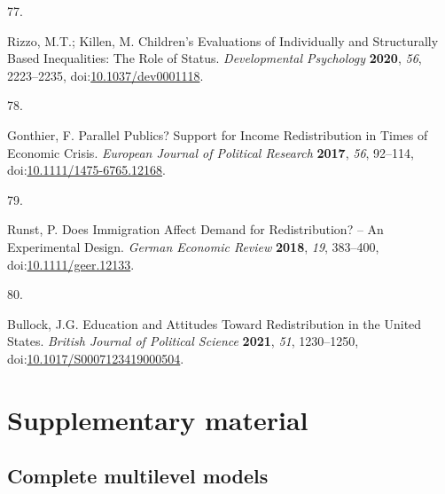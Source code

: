 \documentclass[
  12pt,
  letterpaper,
]{article}
\newlength{\cslhangindent}
\newlength{\csllabelwidth}
\newenvironment{CSLReferences}[2] %
 {\begin{list}{}{%
  \setlength{\itemindent}{0pt}
  \setlength{\leftmargin}{0pt}
  \setlength{\parsep}{0pt}
  \ifodd #1
   \setlength{\leftmargin}{\cslhangindent}
   \setlength{\itemindent}{-1\cslhangindent}
  \fi
  \setlength{\itemsep}{#2\baselineskip}}}
 {\end{list}}
\newcommand{\CSLLeftMargin}[1]{\parbox[t]{\csllabelwidth}{\strut#1\strut}}
\newcommand{\CSLRightInline}[1]{\parbox[t]{\linewidth - \csllabelwidth}{\strut#1\strut}}
\begin{document}
\begin{CSLReferences}{0}{0}
\CSLLeftMargin{77. }%
\CSLRightInline{Rizzo, M.T.; Killen, M. Children's Evaluations of
Individually and Structurally Based Inequalities: {The} Role of Status.
\emph{Developmental Psychology} \textbf{2020}, \emph{56}, 2223--2235,
doi:\href{https://doi.org/10.1037/dev0001118}{10.1037/dev0001118}.}

\CSLLeftMargin{78. }%
\CSLRightInline{Gonthier, F. Parallel Publics? {Support} for Income
Redistribution in Times of Economic Crisis. \emph{European Journal of
Political Research} \textbf{2017}, \emph{56}, 92--114,
doi:\href{https://doi.org/10.1111/1475-6765.12168}{10.1111/1475-6765.12168}.}

\CSLLeftMargin{79. }%
\CSLRightInline{Runst, P. Does {Immigration Affect Demand} for
{Redistribution}? -- {An Experimental Design}. \emph{German Economic
Review} \textbf{2018}, \emph{19}, 383--400,
doi:\href{https://doi.org/10.1111/geer.12133}{10.1111/geer.12133}.}

\CSLLeftMargin{80. }%
\CSLRightInline{Bullock, J.G. Education and {Attitudes} Toward
{Redistribution} in the {United States}. \emph{British Journal of
Political Science} \textbf{2021}, \emph{51}, 1230--1250,
doi:\href{https://doi.org/10.1017/S0007123419000504}{10.1017/S0007123419000504}.}

\end{CSLReferences}


\section{Supplementary material}\label{supplementary-material}

\subsection{Complete multilevel
models}\label{complete-multilevel-models}
\end{document}
